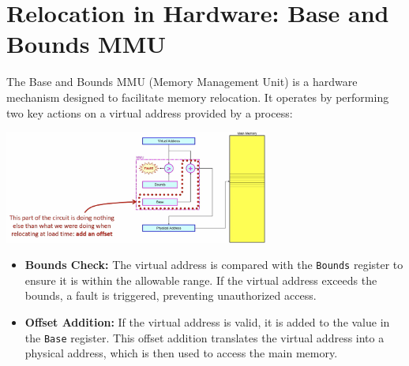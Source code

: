 \section{Relocation in Hardware: Base and Bounds MMU}
The Base and Bounds MMU (Memory Management Unit) is a hardware mechanism designed to facilitate memory relocation. It operates by performing two key actions on a virtual address provided by a process:
\begin{center}
    \includegraphics[width=0.65\textwidth]{chapters/chapter3c/images/relocation.png}
\end{center}
\begin{itemize}
    \item \textbf{Bounds Check:} The virtual address is compared with the \texttt{Bounds} register to ensure it is within the allowable range. If the virtual address exceeds the bounds, a fault is triggered, preventing unauthorized access.
    \item \textbf{Offset Addition:} If the virtual address is valid, it is added to the value in the \texttt{Base} register. This offset addition translates the virtual address into a physical address, which is then used to access the main memory.
\end{itemize}

